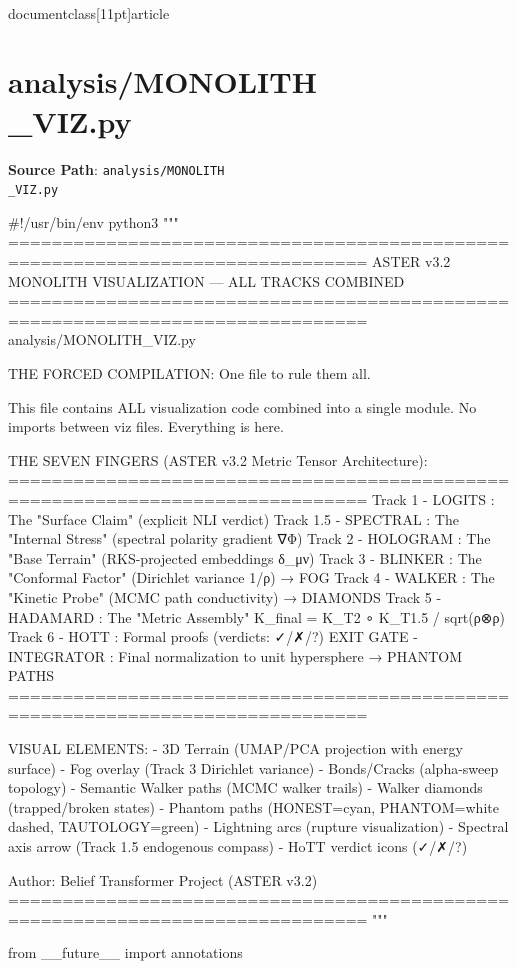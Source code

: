 \\documentclass[11pt]{article}
\begin{document}
\section*{analysis/MONOLITH\\_VIZ.py}
\textbf{Source Path}: \texttt{analysis/MONOLITH\\_VIZ.py}\par
\bigskip
\begin{CodeBlock}
#!/usr/bin/env python3
"""
===============================================================================
ASTER v3.2 MONOLITH VISUALIZATION — ALL TRACKS COMBINED
===============================================================================
analysis/MONOLITH_VIZ.py

THE FORCED COMPILATION: One file to rule them all.

This file contains ALL visualization code combined into a single module.
No imports between viz files. Everything is here.

THE SEVEN FINGERS (ASTER v3.2 Metric Tensor Architecture):
===============================================================================
Track 1   - LOGITS      : The "Surface Claim" (explicit NLI verdict)
Track 1.5 - SPECTRAL    : The "Internal Stress" (spectral polarity gradient ∇Φ)
Track 2   - HOLOGRAM    : The "Base Terrain" (RKS-projected embeddings δ_μν)
Track 3   - BLINKER     : The "Conformal Factor" (Dirichlet variance 1/ρ) → FOG
Track 4   - WALKER      : The "Kinetic Probe" (MCMC path conductivity) → DIAMONDS
Track 5   - HADAMARD    : The "Metric Assembly" K_final = K_T2 ∘ K_T1.5 / sqrt(ρ⊗ρ)
Track 6   - HOTT        : Formal proofs (verdicts: ✓/✗/?)
EXIT GATE - INTEGRATOR  : Final normalization to unit hypersphere → PHANTOM PATHS
===============================================================================

VISUAL ELEMENTS:
- 3D Terrain (UMAP/PCA projection with energy surface)
- Fog overlay (Track 3 Dirichlet variance)
- Bonds/Cracks (alpha-sweep topology)
- Semantic Walker paths (MCMC walker trails)
- Walker diamonds (trapped/broken states)
- Phantom paths (HONEST=cyan, PHANTOM=white dashed, TAUTOLOGY=green)
- Lightning arcs (rupture visualization)
- Spectral axis arrow (Track 1.5 endogenous compass)
- HoTT verdict icons (✓/✗/?)

Author: Belief Transformer Project (ASTER v3.2)
===============================================================================
"""

from __future__ import annotations


\end{CodeBlock}
\end{document}
